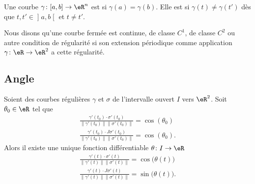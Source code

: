 \begin{definition}
    Une courbe \( \gamma\colon \mathopen[ a , b \mathclose]\to \eR^n\) est  si \( \gamma(a)=\gamma(b)\). Elle est  si \( \gamma(t)\neq \gamma(t')\) dès que \( t,t'\in\mathopen] a , b \mathclose[\) et \( t\neq  t'\).
\end{definition}

\begin{definition}      \label{DEFooSAZTooZGQrQG}
    Nous disons qu'une courbe fermée est continue, de classe \( C^1\), de classe \( C^2\) ou autre condition de régularité si son extension périodique comme application \( \gamma\colon \eR\to \eR^2\) a cette régularité.
\end{definition}

\subsection{Angle}

\begin{lemma}        \label{LEMooUECMooNBDGiR}
    Soient des courbes régulières \( \gamma\) et \( \sigma\) de l'intervalle ouvert \( I\) vers \( \eR^2\). Soit \( \theta_0\in \eR\) tel que
    \begin{subequations}
        \begin{align}
            \frac{ \gamma'(t_0)\cdot\sigma'(t_0) }{ \| \gamma'(t_0) \|\| \sigma'(t_0) \| }=\cos(\theta_0)\\
            \frac{ \gamma'(t_0)\cdot J\sigma'(t_0) }{ \| \gamma'(t_0) \|\| \sigma'(t_0) \| }=\cos(\theta_0).
        \end{align}
    \end{subequations}
    Alors il existe une unique fonction différentiable \( \theta\colon I\to \eR\)
    \begin{subequations}
        \begin{align}
            \frac{ \gamma'(t)\cdot\sigma'(t) }{ \| \gamma'(t) \|\| \sigma'(t) \| }=\cos\big( \theta(t) \big)\\
            \frac{ \gamma'(t)\cdot J\sigma'(t) }{ \| \gamma'(t) \|\| \sigma'(t) \| }=\sin\big( \theta(t) \big).
        \end{align}
    \end{subequations}
\end{lemma}

